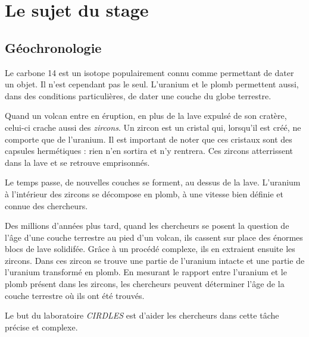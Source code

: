 ﻿\chapter{Le sujet du stage}
\section{Géochronologie} %
Le carbone 14 est un isotope populairement connu comme permettant de dater un objet. Il n'est cependant pas le seul. L'uranium et le plomb permettent aussi, dans des conditions particulières, de dater une couche du globe terrestre.

Quand un volcan entre en éruption, en plus de la lave expulsé de son cratère, celui-ci crache aussi des \textit{zircons}. Un zircon est un cristal qui, lorsqu'il est créé, ne comporte que de l'uranium. Il est important de noter que ces cristaux sont des capsules hermétiques : rien n'en sortira et n'y rentrera. Ces zircons atterrissent dans la lave et se retrouve emprisonnés. 

Le temps passe, de nouvelles couches se forment, au dessus de la lave. L'uranium à l'intérieur des zircons se décompose en plomb, à une vitesse bien définie et connue des chercheurs. 

Des millions d'années plus tard, quand les chercheurs se posent la question de l'âge d'une couche terrestre au pied d'un volcan, ils cassent sur place des énormes blocs de lave solidifée. Grâce à un procédé complexe, ils en extraient ensuite les zircons. Dans ces zircon se trouve une partie de l'uranium intacte et une partie de l'uranium transformé en plomb. En mesurant le rapport entre l'uranium et le plomb présent dans les zircons, les chercheurs peuvent déterminer l'âge de la couche terrestre où ils ont été trouvés.

Le but du laboratoire \textit{CIRDLES} est d'aider les chercheurs dans cette tâche précise et complexe.

